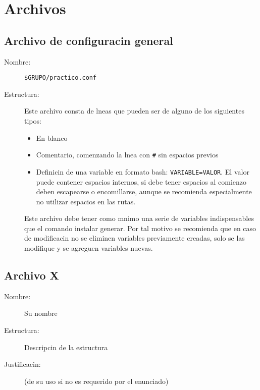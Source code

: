 \documentclass[12pt]{article}
\begin{document}
\section{Archivos}
\subsection{Archivo de configuracin general}
\begin{description}
	\item [Nombre:] \verb|$GRUPO/practico.conf|
	\item [Estructura:] Este archivo consta de lneas que pueden ser de alguno de los siguientes tipos:
	\begin{itemize}
		\item En blanco
		\item Comentario, comenzando la lnea con \verb|#| sin espacios previos
		\item Definicin de una variable en formato bash: \verb|VARIABLE=VALOR|. El valor puede contener espacios internos, si debe tener espacios al comienzo deben escapearse o encomillarse, aunque se recomienda especialmente no utilizar espacios en las rutas.
	\end{itemize}
	Este archivo debe tener como mnimo una serie de variables indispensables que el comando instalar generar. Por tal motivo se recomienda que en caso de modificacin no se eliminen variables previamente creadas, solo se las modifique y se agreguen variables nuevas.
\end{description}

\subsection{Archivo X}
\begin{description}
	\item [Nombre:] Su nombre
	\item [Estructura:] Descripcin de la estructura
	\item [Justificacin:] (de su uso si no es requerido por el enunciado)
\end{description}
\end{document}
